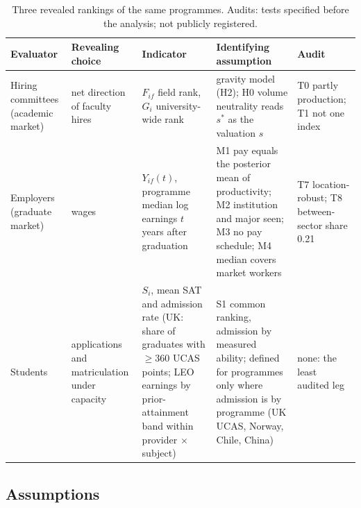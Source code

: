 \begin{table}[!htbp]
\centering
\caption{Three revealed rankings of the same programmes. Audits: tests specified before the analysis; not publicly
registered.}\label{tab:thy-rankings}
\footnotesize
\begin{tabular}{@{}>{\raggedright\arraybackslash}p{2.1cm}>{\raggedright\arraybackslash}p{2.4cm}>{\raggedright\arraybackslash}p{3.4cm}>{\raggedright\arraybackslash}p{4.0cm}>{\raggedright\arraybackslash}p{2.7cm}@{}}
\toprule
Evaluator & Revealing choice & Indicator & Identifying assumption & Audit \\
\midrule
Hiring committees (academic market) & net direction of faculty hires & $F_{if}$ field rank, $G_i$ university-wide rank
\citep{wapman2022quantifying} & gravity model (H2); H0 volume neutrality reads $s^*$ as the valuation $s$ & T0 partly
production; T1 not one index \\
Employers (graduate market) & wages & $Y_{if}(t)$, programme median log earnings $t$ years after graduation & M1 pay
equals the posterior mean of productivity; M2 institution and major seen; M3 no pay schedule; M4 median covers
market workers & T7 location-robust; T8 between-sector share 0.21 \\
Students & applications and matriculation under capacity & $S_i$, mean SAT and admission rate (UK: share of
graduates with $\ge$360 UCAS points; LEO earnings by prior-attainment band within provider $\times$ subject) & S1
common ranking, admission by measured ability; defined for programmes only where admission is by programme (UK
UCAS, Norway, Chile, China) & none: the least audited leg \\
\bottomrule
\end{tabular}
\end{table}

\subsection{Assumptions}\label{app:thy:assumptions}

